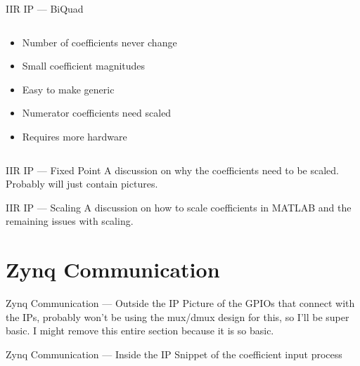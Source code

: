 \documentclass{beamer}
\begin{document}
\begin{frame}{IIR IP --- BiQuad}
  \begin{columns}[T]
    \begin{column}[T]{5cm}
      \begin{itemize}[<+>]
      \item Number of coefficients never change
      \item Small coefficient magnitudes
      \item Easy to make generic
      \end{itemize}
      \begin{itemize}[<+>]
      \item Numerator coefficients need scaled
      \item Requires more hardware
      \end{itemize}
    \end{column}
    \begin{column}[T]{5cm}
      \vfill
    \end{column}
  \end{columns}
\end{frame}
\begin{frame}{IIR IP --- Fixed Point}
  A discussion on why the coefficients need to be scaled. Probably will just
  contain pictures.
\end{frame}
\begin{frame}{IIR IP --- Scaling}
  A discussion on how to scale coefficients in MATLAB and the remaining issues
  with scaling.
\end{frame}

\section{Zynq Communication}
\begin{frame}{Zynq Communication --- Outside the IP}
  Picture of the GPIOs that connect with the IPs, probably won't be using the
  mux/dmux design for this, so I'll be super basic. I might remove this entire
  section because it is so basic.
\end{frame}
\begin{frame}{Zynq Communication --- Inside the IP}
  Snippet of the coefficient input process
\end{frame}
\end{document}

